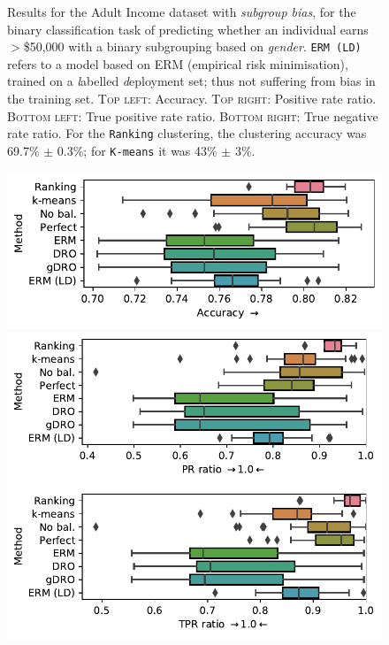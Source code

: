 \begin{figure}[p]
    \caption{%
    Results for the Adult Income dataset with \emph{subgroup bias},
    for the binary classification task of predicting whether an individual earns $>$\$50,000 with a binary subgrouping based on \emph{gender}.
    \texttt{ERM (LD)} refers to a model based on ERM (empirical risk minimisation),
    trained on a \emph{l}abelled \emph{d}eployment set; thus not suffering from bias in the training set.
    \textsc{Top left}: Accuracy.
    \textsc{Top right}: Positive rate ratio.
    \textsc{Bottom left}: True positive rate ratio.
    \textsc{Bottom right}: True negative rate ratio.
    For the \texttt{Ranking} clustering, the clustering accuracy was 69.7\% $\pm$ 0.3\%;
    for \texttt{K-means} it was 43\% $\pm$ 3\%.
    }%
    \label{fig:adult-subgroup-bias}
\end{figure}
\begin{figure}[p]
    \centering
    \includegraphics[width=\columnwidth]{paper3/figures/adult_miss_s_acc.pdf}
    \includegraphics[width=\columnwidth]{paper3/figures/adult_miss_s_prr.pdf}
    \includegraphics[width=\columnwidth]{paper3/figures/adult_miss_s_tprr.pdf}

\end{figure}
